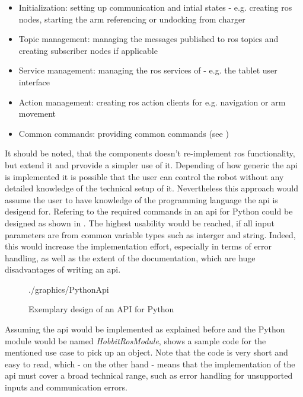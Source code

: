 \begin{itemize}
	\item Initialization: setting up communication and intial states - e.g. creating \gls{ros} nodes, starting the arm referencing or undocking from charger
	\item Topic management: managing the messages published to \gls{ros} topics and creating subscriber nodes if applicable
	\item Service management: managing the \gls{ros} services of \hobbit{} - e.g. the tablet user interface
	\item Action management: creating \gls{ros} action clients for e.g. navigation or arm movement
	\item Common commands: providing common commands (see )
\end{itemize}

It should be noted, that the components doesn't re-implement \gls{ros} functionality, but extend it and prvovide a simpler use of it. Depending of how generic the \gls{api} is implemented it is possible that the user can control the robot without any detailed knowledge of the technical setup of it. Nevertheless this approach would assume the user to have knowledge of the programming language the \gls{api} is desigend for. Refering to the required commands in  an \gls{api} for Python could be designed as shown in . The highest usability would be reached, if all input parameters are from common variable types such as interger and string. Indeed, this would increase the implementation effort, especially in terms of error handling, as well as the extent of the documentation,  which are huge disadvantages of writing an \gls{api}. \\

\begin{figure}[htbp]
	\centering
	\begin{overpic}[width=0.8\linewidth]{./graphics/PythonApi}
	\end{overpic}
	\caption{Exemplary design of an API for Python}%
	\label{fig:PythonApi}%
\end{figure}

Assuming the \gls{api} would be implemented as explained before and the Python module would be named \textit{HobbitRosModule},  shows a sample code for the mentioned use case to pick up an object. Note that the code is very short and easy to read, which - on the other hand - means that the implementation of the \gls{api} must cover a broad technical range, such as error handling for unsupported inputs and communication errors.

